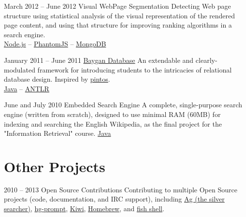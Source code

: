 \documentclass{tccv}
\begin{document}
{{\begin{project_list}
\item{March 2012 -- June 2012}
     {}
     {Visual WebPage Segmentation}
	 {Detecting Web page structure using statistical analysis of the visual representation of the rendered page content, and using that structure for improving ranking algorithms in a search engine.\\
}
	 {
	 	\href{http://nodejs.org}{Node.js} -- 
		\href{http://phantomjs.org}{PhantomJS} -- 
		\href{http://www.mongodb.org}{MongoDB}
	 }


\vspace{-12pt}


\item{January 2011 -- June 2011}
	 {}
	 {\href{https://github.com/baygan/Baygan}{Baygan Database}}
	 {An extendable and clearly-modulated framework for introducing students to the intricacies of relational database design. Inspired by \href{http://www.stanford.edu/class/cs140/projects/pintos/pintos.html}{pintos}.\\
}
	 {
	 	\href{http://www.oracle.com/technetwork/java/}{Java} -- 
		\href{http://www.antlr.org}{ANTLR}
	 }
	 

\vspace{-15pt}
	 
	 
\item{June and July 2010}
	 {}
	 {Embedded Search Engine}
	 {A complete, single-purpose search engine (written from scratch), designed to use minimal RAM (60MB) for indexing and searching the English Wikipedia, as the final project for the "Information Retrieval" course.}
	 {
		 \href{http://www.oracle.com/technetwork/java/}{Java}
	 }


\end{project_list}



\vspace{-18pt}



\section{Other Projects}

\begin{project_list}
	 
\item{2010 -- 2013}
	 {}
	 {Open Source Contributions}
	 {Contributing to multiple Open Source projects (code, documentation, and IRC support), including 
	 \href{https://github.com/ggreer/the_silver_searcher}{Ag (the silver searcher)}, 
	 \href{http://bitbucket.org/sjl/hg-prompt/}{hg-prompt}, \href{https://github.com/allending/Kiwi}{Kiwi}, 
	 \href{https://github.com/mxcl/homebrew}{Homebrew}, and 
	 \href{http://fishshell.com}{fish shell}.}
	 {}
	 

\end{project_list}}}
\end{document}
